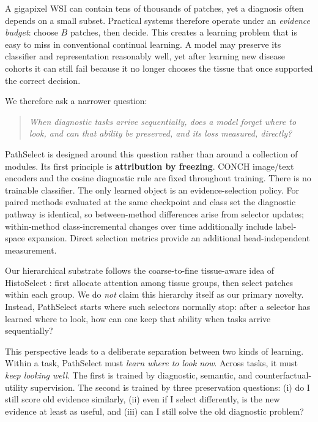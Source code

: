 \documentclass{article}
\begin{document}
A gigapixel WSI can contain tens of thousands of patches, yet a diagnosis often depends on a small subset.
Practical systems therefore operate under an \emph{evidence budget}: choose $B$ patches, then decide.
This creates a learning problem that is easy to miss in conventional continual learning.
A model may preserve its classifier and representation reasonably well, yet after learning new disease cohorts it can still fail because it no longer chooses the tissue that once supported the correct decision.

We therefore ask a narrower question:
\begin{quote}
\emph{When diagnostic tasks arrive sequentially, does a model forget where to look, and can that ability be preserved, and its loss measured, directly?}
\end{quote}
PathSelect is designed around this question rather than around a collection of modules.
Its first principle is \textbf{attribution by freezing}.
CONCH image/text encoders \cite{lu2024conch} and the cosine diagnostic rule are fixed throughout training.
There is no trainable classifier.
The only learned object is an evidence-selection policy.
For paired methods evaluated at the same checkpoint and class set the diagnostic pathway is identical, so between-method differences arise from selector updates; within-method class-incremental changes over time additionally include label-space expansion. Direct selection metrics provide an additional head-independent measurement.

Our hierarchical substrate follows the coarse-to-fine tissue-aware idea of HistoSelect \cite{huang2026histoselect}: first allocate attention among tissue groups, then select patches within each group.
We do \emph{not} claim this hierarchy itself as our primary novelty.
Instead, PathSelect starts where such selectors normally stop: after a selector has learned where to look, how can one keep that ability when tasks arrive sequentially?

This perspective leads to a deliberate separation between two kinds of learning.
Within a task, PathSelect must \emph{learn where to look now}.
Across tasks, it must \emph{keep looking well}.
The first is trained by diagnostic, semantic, and counterfactual-utility supervision.
The second is trained by three preservation questions: (i) do I still score old evidence similarly, (ii) even if I select differently, is the new evidence at least as useful, and (iii) can I still solve the old diagnostic problem?
\end{document}
